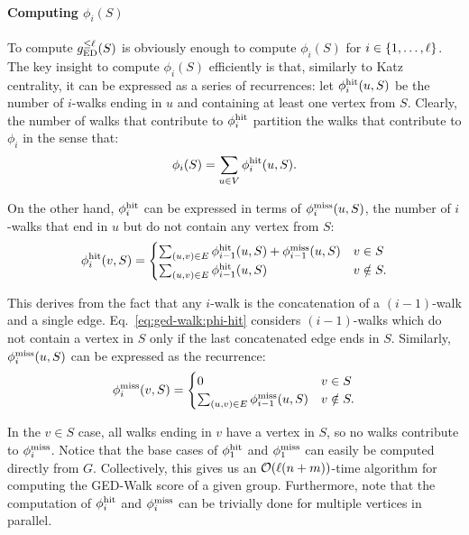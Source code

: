 \paragraph{Computing $\phi_i(S)$}
%
To compute $g_{\text{ED}}^{\le\ell}(S)$ is obviously enough to compute $\phi_i(S)$
for $i \in \set{1, \ldots, \ell}$.
The key insight to compute $\phi_i(S)$ efficiently is that, similarly
to Katz centrality, it can be expressed as a series of recurrences:
let $\phi^{\text{hit}}_i(u, S)$ be the number of $i$-walks ending in $u$ and
containing at least one vertex from $S$.
%
Clearly, the number of walks that contribute to $\phi^{\text{hit}}_i$ partition
the walks that contribute to $\phi_i$ in the sense that:
%
\begin{equation}
\label{eq:ged-walk:phi-hit}
\phi_i(S) = \sum_{u \in V}\phi^{\text{hit}}_i(u, S).
\end{equation}

On the other hand, $\phi^{\text{hit}}_i$ can be expressed in terms of $\phi^{\text{miss}}_i(u, S)$,
\ie the number of $i$-walks that end in $u$ but do not contain any
vertex from $S$:
%
\begin{equation}
\label{eq:ged-walk:phit-rec}
\phi^{\text{hit}}_i(v, S) =
\begin{cases}
    \sum_{(u, v) \in E}\phi^{\text{hit}}_{i - 1}(u, S) + \phi^{\text{miss}}_{i - 1}(u, S) &v \in S\\
    \sum_{(u, v) \in E}\phi^{\text{hit}}_{i - 1}(u, S) &v\notin S.
\end{cases}
\end{equation}

This derives from the fact that any $i$-walk is the concatenation of a
$(i - 1)$-walk and a single edge. Eq.~\eqref{eq:ged-walk:phi-hit} considers
$(i - 1)$-walks which do not contain a vertex in $S$ only if the last
concatenated edge ends in $S$.
Similarly, $\phi^{\text{miss}}_i(u, S)$ can be expressed as the recurrence:
%
\begin{equation}
\label{eq:ged-walk:pmiss-rec}
\phi^{\text{miss}}_i(v, S) =
\begin{cases}
0 & v\in S\\
\sum_{(u, v) \in E}\phi^{\text{miss}}_{i - 1}(u, S) & v \notin S.
\end{cases}
\end{equation}

In the $v \in S$ case, all walks ending in $v$ have a vertex in $S$, so no
walks contribute to $\phi^{\text{miss}}_i$. Notice that the base cases of $\phi^{\text{hit}}_1$ and
$\phi^{\text{miss}}_1$ can easily be computed directly from $G$. Collectively, this gives
us an $\mathcal{O}(\ell(n + m))$-time algorithm for computing the GED-Walk score of a
given group. Furthermore, note that the computation of $\phi^{\text{hit}}_i$ and $\phi^{\text{miss}}_i$
can be trivially done for multiple vertices in parallel.

